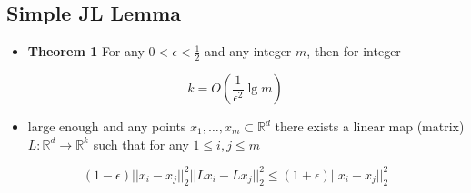 \documentclass[11pt]{article}
\begin{document}
\subsection{Simple JL Lemma}
\label{sec:org80259aa}
\begin{itemize}
\item \textbf{Theorem 1} For any \(0 < \epsilon < \frac12\) and any integer \(m\), then for integer
\end{itemize}
\begin{equation}
  k = O (\frac1{\epsilon^2} \lg m)
\end{equation}
\begin{itemize}
\item large enough and any points \(x_1, \dots, x_m \subset \mathbb R^d\) there exists a linear map (matrix) \(L: \mathbb R^d \to \mathbb R^k\) such that for any \(1 \leq i, j \leq m\)
\end{itemize}
\begin{equation}
	(1- \epsilon) || x_i - x_j ||_2^2 ||L x_i - Lx_j||^2_2 \leq (1+\epsilon) ||x_i - x_j||^2_2
\end{equation}
\end{document}
